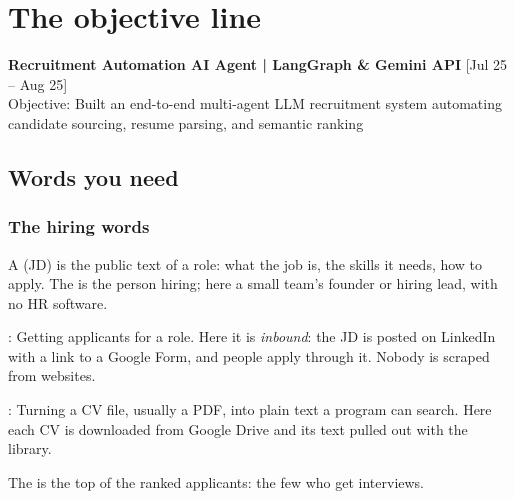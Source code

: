 \chapter{The objective line}
\label{ch:objective}

\begin{cvline}
\textbf{Recruitment Automation AI Agent | LangGraph \& Gemini API} \hfill [Jul 25 -- Aug 25]\\
Objective: Built an end-to-end multi-agent LLM recruitment system automating candidate sourcing, resume parsing, and semantic ranking
\end{cvline}

\section{Words you need}

\subsection*{The hiring words}

\begin{definition}
A  (JD) is the public text of a role: what the job is, the skills it needs, how to apply. The  is the person hiring; here a small team's founder or hiring lead, with no HR software.
\end{definition}

\begin{definition}
: Getting applicants for a role. Here it is \emph{inbound}: the JD is posted on LinkedIn with a link to a Google Form, and people apply through it. Nobody is scraped from websites.
\end{definition}

\begin{definition}
: Turning a CV file, usually a PDF, into plain text a program can search. Here each CV is downloaded from Google Drive and its text pulled out with the  library.
\end{definition}

\begin{definition}[Shortlist]
The  is the top of the ranked applicants: the few who get interviews.
\end{definition}

